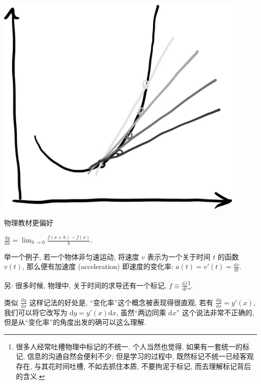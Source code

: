 \begin{tcolorbox}[size=fbox, breakable, enhanced jigsaw, sidebyside]
\includegraphics[width=0.9\textwidth]{img/image-20230614124234964.png}
\tcblower
{}
\end{tcolorbox}

物理教材更偏好

$\frac{\mathrm{d}y}{\mathrm{d}x}=\lim_{h\rightarrow0}\frac{f(x+h)-f(x)}{h}.$

\begin{newquote}
举一个例子, 若一个物体非匀速运动, 将速度 $v$ 表示为一个关于时间 $t$
的函数 $v(t)$, 那么便有加速度 (acceleration) 即速度的变化率:
$a(t)=v'(t)=\frac{\mathrm{d}v}{\mathrm{d}t}$.

另: 很多时候, 物理中, 关于时间的求导还有一个标记,
$\dot{f}\equiv \frac{\mathrm{d}f}{\mathrm{d}t}$\footnote{很多人经常吐槽物理中标记的不统一.
  个人当然也觉得, 如果有一套统一的标记, 信息的沟通自然会便利不少;
  但是学习的过程中, 既然标记不统一已经客观存在, 与其花时间吐槽,
  不如去抓住本质, 不要拘泥于标记, 而去理解标记背后的含义.}.
\end{newquote}

类似 $\frac{\mathrm{d}y}{\mathrm{d}x}$ 这样记法的好处是,
``变化率''这个概念被表现得很直观, 若有
$\frac{\mathrm{d}y}{\mathrm{d}x}=y'(x)$, 我们可以将它改写为
$\mathrm{d}y=y'(x)\mathrm{d}x$, 虽然``两边同乘 $\mathrm{d}x$''
这个说法非常不正确的, 但是从``变化率''的角度出发的确可以这么理解.

